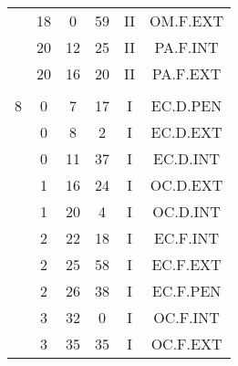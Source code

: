 \documentclass[12pt, a4paper]{article}
\begin{document}
\begin{multicols}{3}
{\begin{tabular}{c c c c c c}
	 	 	 	 & 18 & 0 & 59 & II & OM.F.EXT\\%
	 	 	 	 & 20 & 12 & 25 & II & PA.F.INT\\%
	 	 	 	 & 20 & 16 & 20 & II & PA.F.EXT\\%
	 	 	 	 & & & & & \\%
	 	 	 	8 & 0 & 7 & 17 & I & EC.D.PEN\\%
	 	 	 	 & 0 & 8 & 2 & I & EC.D.EXT\\%
	 	 	 	 & 0 & 11 & 37 & I & EC.D.INT\\%
	 	 	 	 & 1 & 16 & 24 & I & OC.D.EXT\\%
	 	 	 	 & 1 & 20 & 4 & I & OC.D.INT\\%
	 	 	 	 & 2 & 22 & 18 & I & EC.F.INT\\%
	 	 	 	 & 2 & 25 & 58 & I & EC.F.EXT\\%
	 	 	 	 & 2 & 26 & 38 & I & EC.F.PEN\\%
	 	 	 	 & 3 & 32 & 0 & I & OC.F.INT\\%
	 	 	 	 & 3 & 35 & 35 & I & OC.F.EXT\\%
	 	 \end{tabular}
 	}
\end{multicols}
\end{document}
